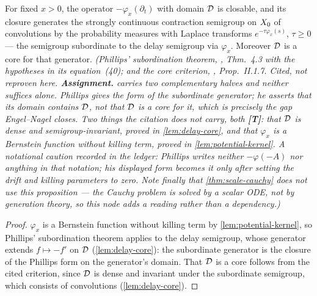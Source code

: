 \begin{proposition}\label{prop:fixed-scale-semigroup}
For fixed $x > 0$, the operator $-\varphi_x(\partial_t)$ with domain $\mathcal{D}$ is closable, and
its closure generates the strongly continuous contraction semigroup on $X_0$ of convolutions
by the probability measures with Laplace transforms $e^{-\tau \varphi_x(s)}$, $\tau \ge 0$ ---
the semigroup subordinate to the delay semigroup via $\varphi_x$. Moreover $\mathcal{D}$ is a core
for that generator.
\statusA\quad{}\quad\emph{(Phillips' subordination theorem,
, Thm.~4.3 with the hypotheses in its equation~(40); and the
core criterion, , Prop.~II.1.7. Cited, not reproven here.
\textbf{Assignment.}  carries two complementary halves and neither suffices alone.
Phillips gives the form of the subordinate generator; he asserts that its domain \emph{contains}
$\mathcal{D}$, not that $\mathcal{D}$ is a core for it, which is precisely the gap Engel--Nagel closes.
Two things the citation does not carry, both \textbf{[T]}: that $\mathcal{D}$ is dense and
semigroup-invariant, proved in \ref{lem:delay-core}, and that $\varphi_x$ is a Bernstein
function without killing term, proved in \ref{lem:potential-kernel}. A notational caution
recorded in the ledger: Phillips writes neither $-\varphi(-A)$ nor anything in that notation;
his displayed form becomes it only after setting the drift and killing parameters to zero.
Note finally that \ref{thm:scale-cauchy} does \emph{not} use this proposition --- the Cauchy
problem is solved by a scalar ODE, not by generation theory, so this node adds a reading
rather than a dependency.)}
\end{proposition}

\begin{proof}
$\varphi_x$ is a Bernstein function without killing term by \ref{lem:potential-kernel}, so
Phillips' subordination theorem applies to the delay semigroup, whose generator extends
$f \mapsto -f'$ on $\mathcal{D}$ (\ref{lem:delay-core}): the subordinate generator is the closure of
the Phillips form on the generator's domain. That $\mathcal{D}$ is a core follows from the cited
criterion, since $\mathcal{D}$ is dense and invariant under the subordinate semigroup, which
consists of convolutions (\ref{lem:delay-core}).
\end{proof}

